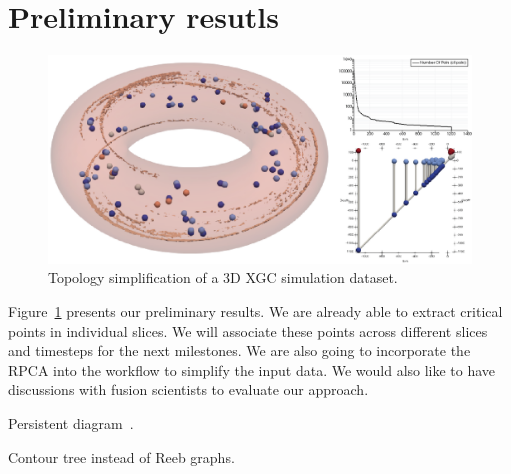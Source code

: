 \section{Preliminary resutls}

\begin{figure}[!h]
  \centering
  \includegraphics[width=\linewidth]{Figs/simplification3D}
  \caption{Topology simplification of a 3D XGC simulation dataset.}
  \label{fig:results}
\end{figure}



Figure~\ref{fig:results} presents our preliminary results.  We are already able to extract critical points in individual slices.  We will associate these points across different slices and timesteps for the next milestones.  We are also going to incorporate the RPCA into the workflow to simplify the input data.  We would also like to have discussions with fusion scientists to evaluate our approach.  

Persistent diagram~\cite{EdelsbrunnerLZ02}.  

Contour tree instead of Reeb graphs.  